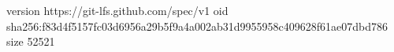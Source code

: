 version https://git-lfs.github.com/spec/v1
oid sha256:f83d4f5157fc03d6956a29b5f9a4a002ab31d9955958c409628f61ae07dbd786
size 52521
